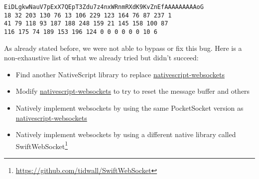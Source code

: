 \begin{description}[style=nextline]
\begin{description}[style=nextline]
\item[Received]
\begin{lstlisting}
EiDLgkwNauV7pExX7QEpT3Zdu7z4nxWRnmRXdK9KvZnEfAAAAAAAAAoG
18 32 203 130 76 13 106 229 123 164 76 87 237 1
41 79 118 93 187 188 248 159 21 145 158 100 87
116 175 74 189 153 196 124 0 0 0 0 0 0 10 6
\end{lstlisting}
\end{description}
As already stated before, we were not able to bypass or fix this bug. Here is a non-exhaustive list of what we already tried but didn't succeed:
\begin{itemize}
\item Find another NativeScript library to replace \url{nativescript-websockets}
\item Modify \url{nativescript-websockets} to try to reset the message buffer and others
\item Natively implement websockets by using the same PocketSocket version as \url{nativescript-websockets}
\item Natively implement websockets by using a different native library called SwiftWebSocket\footnote{\url{https://github.com/tidwall/SwiftWebSocket}}
\end{itemize}
\end{description}
